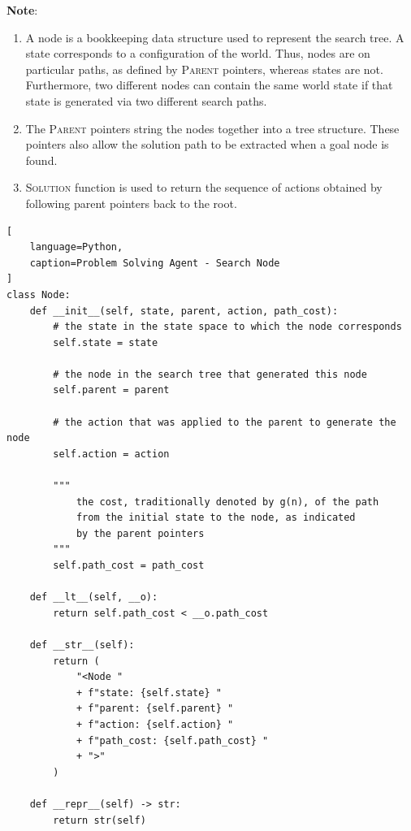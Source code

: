 \textbf{Note}:
\begin{enumerate}
    \item A node is a bookkeeping data structure used to represent the search tree.
    A state corresponds to a configuration of the world.
    Thus, nodes are on particular paths, as defined by \textsc{Parent} pointers, whereas states are not.
    Furthermore, two different nodes can contain the same world state if that state is generated via two different search paths.
    \hfill \cite{ai/book/Artificial-Intelligence-A-Modern-Approach/Russell-Norvig}

    \item The \textsc{Parent} pointers string the nodes together into a tree structure. These pointers also allow the solution path to be extracted when a goal node is found.
    \hfill \cite{ai/book/Artificial-Intelligence-A-Modern-Approach/Russell-Norvig}

    \item \textsc{Solution} function is used to return the sequence of actions obtained by following parent pointers back to the root.
    \hfill \cite{ai/book/Artificial-Intelligence-A-Modern-Approach/Russell-Norvig}
\end{enumerate}

\vspace{0.5cm}

\begin{lstlisting}[
    language=Python,
    caption=Problem Solving Agent - Search Node
]
class Node:
    def __init__(self, state, parent, action, path_cost):
        # the state in the state space to which the node corresponds
        self.state = state

        # the node in the search tree that generated this node
        self.parent = parent

        # the action that was applied to the parent to generate the node
        self.action = action

        """
            the cost, traditionally denoted by g(n), of the path
            from the initial state to the node, as indicated
            by the parent pointers
        """
        self.path_cost = path_cost

    def __lt__(self, __o):
        return self.path_cost < __o.path_cost

    def __str__(self):
        return (
            "<Node "
            + f"state: {self.state} "
            + f"parent: {self.parent} "
            + f"action: {self.action} "
            + f"path_cost: {self.path_cost} "
            + ">"
        )

    def __repr__(self) -> str:
        return str(self)
\end{lstlisting}



